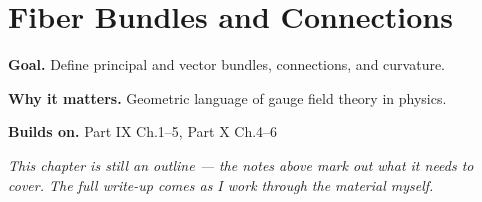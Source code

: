 \chapter{Fiber Bundles and Connections}
\label{ch:10-differential-geometry-07}

\begin{chapterintro}
\textbf{Goal.} Define principal and vector bundles, connections, and curvature.

\textbf{Why it matters.} Geometric language of gauge field theory in physics.

\textbf{Builds on.} Part IX Ch.1–5, Part X Ch.4–6
\end{chapterintro}

\textit{This chapter is still an outline --- the notes above mark out what it needs to cover. The full write-up comes as I work through the material myself.}
